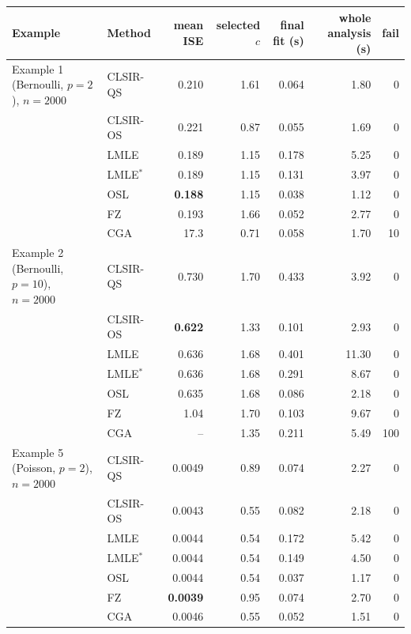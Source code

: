 \begin{tabular}{llrrrrr}
\toprule
Example & Method & mean ISE & selected $c$ & final fit (s) & whole analysis (s) & fail\\
\midrule
Example 1 (Bernoulli, $p=2$), $n=2000$ & CLSIR-QS & 0.210 & 1.61 & 0.064 & 1.80 & 0\\
 & CLSIR-OS & 0.221 & 0.87 & 0.055 & 1.69 & 0\\
 & LMLE & 0.189 & 1.15 & 0.178 & 5.25 & 0\\
 & LMLE$^{\ast}$ & 0.189 & 1.15 & 0.131 & 3.97 & 0\\
 & OSL & \textbf{0.188} & 1.15 & 0.038 & 1.12 & 0\\
 & FZ & 0.193 & 1.66 & 0.052 & 2.77 & 0\\
 & CGA & 17.3 & 0.71 & 0.058 & 1.70 & 10\\
\addlinespace
Example 2 (Bernoulli, $p=10$), $n=2000$ & CLSIR-QS & 0.730 & 1.70 & 0.433 & 3.92 & 0\\
 & CLSIR-OS & \textbf{0.622} & 1.33 & 0.101 & 2.93 & 0\\
 & LMLE & 0.636 & 1.68 & 0.401 & 11.30 & 0\\
 & LMLE$^{\ast}$ & 0.636 & 1.68 & 0.291 & 8.67 & 0\\
 & OSL & 0.635 & 1.68 & 0.086 & 2.18 & 0\\
 & FZ & 1.04 & 1.70 & 0.103 & 9.67 & 0\\
 & CGA & -- & 1.35 & 0.211 & 5.49 & 100\\
\addlinespace
Example 5 (Poisson, $p=2$), $n=2000$ & CLSIR-QS & 0.0049 & 0.89 & 0.074 & 2.27 & 0\\
 & CLSIR-OS & 0.0043 & 0.55 & 0.082 & 2.18 & 0\\
 & LMLE & 0.0044 & 0.54 & 0.172 & 5.42 & 0\\
 & LMLE$^{\ast}$ & 0.0044 & 0.54 & 0.149 & 4.50 & 0\\
 & OSL & 0.0044 & 0.54 & 0.037 & 1.17 & 0\\
 & FZ & \textbf{0.0039} & 0.95 & 0.074 & 2.70 & 0\\
 & CGA & 0.0046 & 0.55 & 0.052 & 1.51 & 0\\
\bottomrule
\end{tabular}